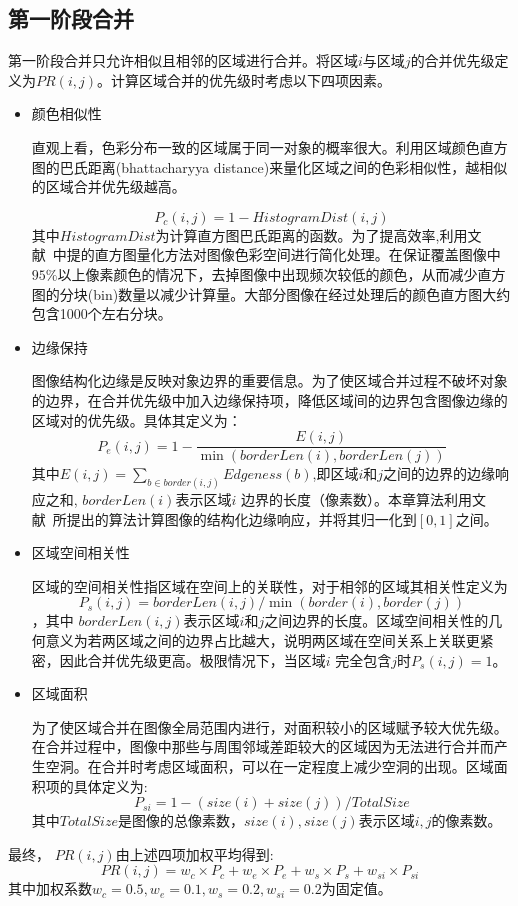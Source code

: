 \subsection{第一阶段合并}
\label{subsec:mergeP1}
第一阶段合并只允许相似且相邻的区域进行合并。将区域$i$与区域$j$的合并优先级定义为$PR(i,j)$。计算区域合并的优先级时考虑以下四项因素。
\begin{itemize}
\item 颜色相似性\par
    直观上看，色彩分布一致的区域属于同一对象的概率很大。利用区域颜色直方图的巴氏距离(bhattacharyya distance)来量化区域之间的色彩相似性，越相似的区域合并优先级越高。

    \begin{equation}
    \label{equ:chap2:Pc}
    P_{c}(i,j)=1-HistogramDist(i,j)
    \end{equation}
    其中$HistogramDist$为计算直方图巴氏距离的函数。为了提高效率,利用文献~中提的直方图量化方法对图像色彩空间进行简化处理。在保证覆盖图像中$95\%$以上像素颜色的情况下，去掉图像中出现频次较低的颜色，从而减少直方图的分块(bin)数量以减少计算量。大部分图像在经过处理后的颜色直方图大约包含1000个左右分块。
\item 边缘保持\par
    图像结构化边缘是反映对象边界的重要信息。为了使区域合并过程不破坏对象的边界，在合并优先级中加入边缘保持项，降低区域间的边界包含图像边缘的区域对的优先级。具体其定义为：
    $$P_{e}(i,j)=1-\frac{E(i,j)}{\min(borderLen(i),borderLen(j))}$$
    其中$E(i,j)=\sum_{b\in border(i,j)}Edgeness(b)$,即区域$i$和$j$之间的边界的边缘响应之和, $borderLen(i)$表示区域$i$ 边界的长度（像素数）。本章算法利用文献~所提出的算法计算图像的结构化边缘响应，并将其归一化到$[0,1]$之间。
\item 区域空间相关性\par
    区域的空间相关性指区域在空间上的关联性，对于相邻的区域其相关性定义为$$P_{s}(i,j)=borderLen(i,j)/\min⁡(border(i),border(j))$$，其中 $borderLen(i,j)$表示区域$i$和$j$之间边界的长度。区域空间相关性的几何意义为若两区域之间的边界占比越大，说明两区域在空间关系上关联更紧密，因此合并优先级更高。极限情况下，当区域$i$ 完全包含$j$时$P_{s} (i,j)=1$。
\item 区域面积\par
    为了使区域合并在图像全局范围内进行，对面积较小的区域赋予较大优先级。在合并过程中，图像中那些与周围邻域差距较大的区域因为无法进行合并而产生空洞。在合并时考虑区域面积，可以在一定程度上减少空洞的出现。区域面积项的具体定义为:
    $$P_{si}=1-(size(i)+size(j))/TotalSize$$
其中$TotalSize$是图像的总像素数，$size(i),size(j)$表示区域$i,j$的像素数。
\end{itemize}
最终， $PR(i,j)$由上述四项加权平均得到:
\begin{equation}
   \label{equ:chap2:PR}
   PR(i,j)=w_{c}\times P_{c}+w_{e} \times P_{e} + w_{s} \times P_{s} + w_{si} \times P_{si}
\end{equation}
其中加权系数$w_c=0.5, w_e=0.1, w_s=0.2, w_{si}=0.2$为固定值。\par

